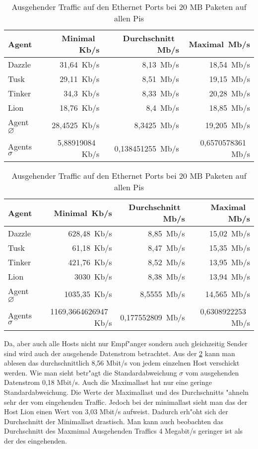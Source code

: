 \begin{table}
\centering
\begin{tabular}{l%
 r<{\,Kb/s}%
 r<{\,Mb/s}%
 r<{\,Mb/s}%
}
Agent  				& Minimal		& Durchschnitt		& Maximal	\\
\hline
Dazzle 				& 31,64			& 8,13 			& 18,54		\\
Tusk 				& 29,11			& 8,51			& 19,15		\\
Tinker				& 34,3			& 8,33			& 20,28		\\
Lion				& 18,76			& 8,4			& 18,85		\\ 
Agent $\diameter $	 	& 28,4525		& 8,3425		& 19,205	\\   
Agents $\sigma $		& 5,88919084		& 0,138451255		& 0,6570578361	\\

\end{tabular}
\caption{Eingehender Traffic auf den Ethernet Ports bei 20 MB Paketen auf allen Pis}
\label{tab:EingehenderTraffic200Mb}
\begin{tabular}{l%
 r<{\,Kb/s}%
 r<{\,Mb/s}%
 r<{\,Mb/s}%
}
Agent  				& Minimal		& Durchschnitt		& Maximal	\\	
\hline
Dazzle 				& 628,48		& 8,85	 		& 15,02		\\
Tusk 				& 61,18			& 8,47			& 15,35		\\
Tinker				& 421,76		& 8,52			& 13,95		\\
Lion				& 3030			& 8,38			& 13,94		\\ 
Agent $\diameter $	 	& 1035,35		& 8,5555		& 14,565	\\   
Agents $\sigma $		& 1169,3664626947	& 0,177552809		& 0,6308922253	\\

\end{tabular}
\caption{Ausgehender Traffic auf den Ethernet Ports bei 20 MB Paketen auf allen Pis}
\label{tab:AusgehenderTraffic200Mb}

\end{table}

Da, aber auch alle Hosts nicht nur Empf"anger sondern auch gleichzeitig Sender sind wird auch der ausgehende %
Datenstrom betrachtet. Aus der \cref{tab:AusgehenderTraffic200Mb} kann man ablesen das durchschnittlich %
8,56 Mbit/s von jedem einzelnen Host verschickt werden. Wie man sieht betr"agt die Standardabweichung %
$\sigma$ vom ausgehenden Datenstrom 0,18 Mbit/s. Auch die Maximallast hat nur eine geringe Standardabweichung. %
Die Werte der Maximallast und des Durchschnitts "ahneln sehr der vom eingehenden Traffic. %
Jedoch bei der minimallast sieht man das der Host Lion einen Wert von 3,03 Mbit/s aufweist. %
Dadurch erh"oht sich der Durchschnitt der Minimallast drastisch. Man kann auch beobachten %
das Durchschnitt des Maxmimal Ausgehenden Traffics 4 Megabit/s geringer ist als der des eingehenden. %


